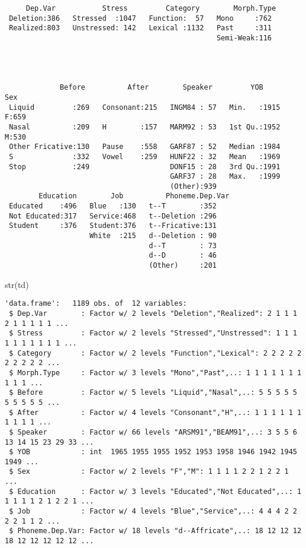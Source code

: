 \documentclass[
  12pt,
  letterpaper]{article}
\newenvironment{Shaded}{\begin{snugshade}}{\end{snugshade}}
\newcommand{\FunctionTok}[1]{\textcolor[rgb]{0.28,0.35,0.67}{#1}}
\newcommand{\NormalTok}[1]{\textcolor[rgb]{0.00,0.23,0.31}{#1}}
\begin{document}
\begin{verbatim}
     Dep.Var           Stress         Category        Morph.Type 
 Deletion:386   Stressed  :1047   Function:  57   Mono     :762  
 Realized:803   Unstressed: 142   Lexical :1132   Past     :311  
                                                  Semi-Weak:116  
                                                                 
                                                                 
                                                                 
                                                                 
             Before          After        Speaker         YOB       Sex    
 Liquid         :269   Consonant:215   INGM84 : 57   Min.   :1915   F:659  
 Nasal          :209   H        :157   MARM92 : 53   1st Qu.:1952   M:530  
 Other Fricative:130   Pause    :558   GARF87 : 52   Median :1984          
 S              :332   Vowel    :259   HUNF22 : 32   Mean   :1969          
 Stop           :249                   DONF15 : 28   3rd Qu.:1991          
                                       GARF37 : 28   Max.   :1999          
                                       (Other):939                         
        Education        Job          Phoneme.Dep.Var
 Educated    :496   Blue   :130   t--T        :352   
 Not Educated:317   Service:468   t--Deletion :296   
 Student     :376   Student:376   t--Fricative:131   
                    White  :215   d--Deletion : 90   
                                  d--T        : 73   
                                  d--D        : 46   
                                  (Other)     :201   
\end{verbatim}

\begin{Shaded}
\begin{Highlighting}[]
\FunctionTok{str}\NormalTok{(td)}
\end{Highlighting}
\end{Shaded}

\begin{verbatim}
'data.frame':   1189 obs. of  12 variables:
 $ Dep.Var        : Factor w/ 2 levels "Deletion","Realized": 2 1 1 1 2 1 1 1 1 1 ...
 $ Stress         : Factor w/ 2 levels "Stressed","Unstressed": 1 1 1 1 1 1 1 1 1 1 ...
 $ Category       : Factor w/ 2 levels "Function","Lexical": 2 2 2 2 2 2 2 2 2 2 ...
 $ Morph.Type     : Factor w/ 3 levels "Mono","Past",..: 1 1 1 1 1 1 1 1 1 1 ...
 $ Before         : Factor w/ 5 levels "Liquid","Nasal",..: 5 5 5 5 5 5 5 5 5 5 ...
 $ After          : Factor w/ 4 levels "Consonant","H",..: 1 1 1 1 1 1 1 1 1 1 ...
 $ Speaker        : Factor w/ 66 levels "ARSM91","BEAM91",..: 3 5 5 6 13 14 15 23 29 33 ...
 $ YOB            : int  1965 1955 1955 1952 1953 1958 1946 1942 1945 1949 ...
 $ Sex            : Factor w/ 2 levels "F","M": 1 1 1 1 2 2 1 2 2 1 ...
 $ Education      : Factor w/ 3 levels "Educated","Not Educated",..: 1 1 1 1 1 2 1 2 2 1 ...
 $ Job            : Factor w/ 4 levels "Blue","Service",..: 4 4 4 2 2 2 2 1 1 2 ...
 $ Phoneme.Dep.Var: Factor w/ 18 levels "d--Affricate",..: 18 12 12 12 18 12 12 12 12 12 ...
\end{verbatim}
\end{document}
